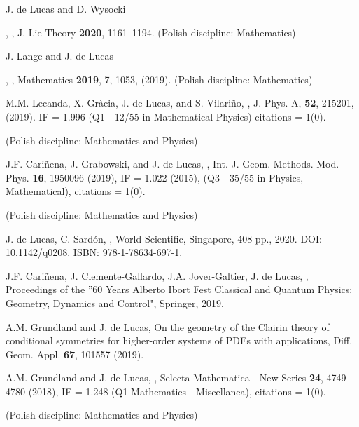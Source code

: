 \documentclass[12pt,reqno]{amsbook}
\begin{document}
\begin{enumerate}
        {\item J. de Lucas and D. Wysocki}, \color{blue}{A Grassmann and graded approach to coboundary Lie bialgebras, their classification, and Yang-Baxter equations}\color{black}, J. Lie Theory {\bf 2020}, 1161--1194. (Polish discipline: Mathematics)
{\item J. Lange and J. de Lucas}, \color{black}, Mathematics {\bf 2019}, 7, 1053, (2019). (Polish discipline: Mathematics)
{\item M.M. Lecanda, X. Gr\`acia, J. de Lucas, and S. Vilariño,  \color{blue}{Multisymplectic structures and invariant
                tensors for Lie systems}\color{black},  J. Phys. A, {\bf 52}, 215201, (2019).  IF = 1.996 (Q1 - 12/55 in Mathematical Physics) citations = 1(0).}  (Polish discipline: Mathematics and Physics)
        
{\item J.F. Cari\~nena, J. Grabowski, and J. de Lucas,  \color{blue}{Quasi-Lie Schemes for PDEs}\color{black},  Int. J. Geom. Methods. Mod. Phys. {\bf 16},  1950096 (2019), IF = 1.022 (2015), (Q3 - 35/55 in Physics, Mathematical), citations = 1(0).}  (Polish discipline: Mathematics and Physics)


{ \item J. de Lucas, C. Sard\'on, \color{blue}{A Guide to Lie systems with Compatible Geometric Structures}\color{black},  World Scientific, Singapore, 408 pp., 2020. DOI: 10.1142/q0208. ISBN: 978-1-78634-697-1.}

{ \item J.F. Cari\~nena, J. Clemente-Gallardo, J.A. Jover-Galtier, J. de Lucas, \color{blue}{Application of Lie systems to Quantum Mechanics:
Superposition rules}\color{black},  Proceedings of the ''60 Years Alberto Ibort Fest Classical and Quantum Physics: Geometry, Dynamics and
Control", Springer, 2019.}   

\item A.M. Grundland and J. de Lucas,\color{blue} {On the geometry of the Clairin theory of conditional symmetries for higher-order systems of PDEs with applications}\color{black}, Diff. Geom. Appl. {\bf 67}, 101557 (2019).


{ \item A.M. Grundland and J. de Lucas, \color{blue}{A cohomological approach to immersion formulas via integrable systems}\color{black},  Selecta Mathematica - New Series {\bf 24}, 4749--4780 (2018), IF = 1.248 (Q1 Mathematics - Miscellanea), citations = 1(0).}  (Polish discipline: Mathematics and Physics)


\end{enumerate}
\end{document}
